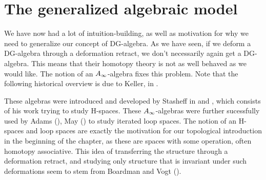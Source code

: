 






\section{The generalized algebraic model}

We have now had a lot of intuition-building, as well as motivation for why we need to generalize our concept of DG-algebra. As we have seen, if we deform a DG-algebra through a deformation retract, we don't necessarily again get a DG-algebra. This means that their homotopy theory is not as well behaved as we would like. The notion of an $A_{\infty}$-algebra fixes this problem. Note that the following historical overview is due to Keller, in \cite{keller}.

These algebras were introduced and developed by Stasheff in \cite{h-spaces1} and \cite{h-spaces2}, which consists of his work trying to study H-spaces. These $A_{\infty}$-algebras were further sucessfully used by Adams (\cite{adams_loop}), May (\cite{may_loop}) to study iterated loop spaces. The notion of an H-spaces and loop spaces are exactly the motivation for our topological introduction in the beginning of the chapter, as these are spaces with some operation, often homotopy associative. This idea of transferring the structure through a deformation retract, and studying only structure that is invariant under such deformations seem to stem from Boardman and Vogt (\cite{boardman_vogt}). 

